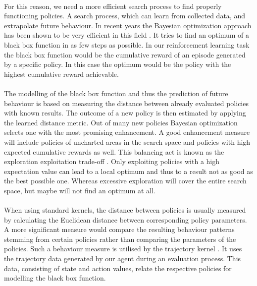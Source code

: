 \\
For this reason, we need a more efficient search process to find properly functioning policies. A search process, which can learn from collected data, and extrapolate future behaviour. In recent years the Bayesian optimization approach has been shown to be very efficient in this field \cite{brochu2010tutorial, shahriari2016taking, lizotte2008practical}. It tries to find an optimum of a black box function in as few steps as possible. In our reinforcement learning task the black box function would be the cumulative reward of an episode generated by a specific policy. In this case the optimum would be the policy with the highest cumulative reward achievable.\\
\\
The modelling of the black box function and thus the prediction of future behaviour is based on measuring the distance between already evaluated policies with known results. The outcome of a new policy is then estimated by applying the learned distance metric. Out of many new policies Bayesian optimization selects one with the most promising enhancement. A good enhancement measure will include policies of uncharted areas in the search space and policies with high expected cumulative rewards as well. This balancing act is known as the exploration exploitation trade-off \cite{brochu2010tutorial}. Only exploiting policies with a high expectation value can lead to a local optimum and thus to a result not as good as the best possible one. Whereas excessive exploration will cover the entire search space, but maybe will not find an optimum at all.\\
\\
When using standard kernels, the distance between policies is usually measured by calculating the Euclidean distance \cite{rasmussen2006gaussian} between corresponding policy parameters. A more significant measure would compare the resulting behaviour patterns stemming from certain policies rather than comparing the parameters of the policies. Such a behaviour measure is utilised by the trajectory kernel \cite{wilson2014using}. It uses the trajectory data generated by our agent during an evaluation process. This data, consisting of state and action values, relate the respective policies for modelling the black box function.\\
\\
